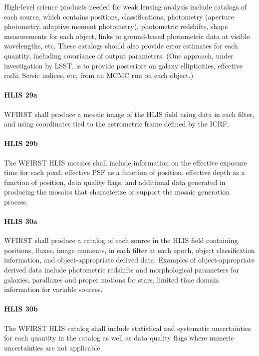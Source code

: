 High-level science products needed for weak lensing analysis include catalogs of
each source, which contains positions, classifications, photometry (aperture
photometry, adaptive moment photometry), photometric redshifts, shape
measurements for each object, links to ground-based photometric data at visible
wavelengths, etc. These catalogs should also provide error estimates for each
quantity, including covariance of output parameters. (One approach, under
investigation by LSST, is to provide posteriors on galaxy ellipticities,
effective radii, Sersic indices, etc, from an MCMC run on each object.)

\paragraph{HLIS 29a} WFIRST shall produce a mosaic image of the HLIS field using data in
each filter, and using coordinates tied to the astrometric frame defined by the
ICRF.

\paragraph{HLIS 29b} The WFIRST HLIS mosaics shall include information on the effective
exposure time for each pixel, effective PSF as a function of position, effective
depth as a function of position, data quality flags, and additional data
generated in producing the mosaics that characterize or support the mosaic
generation process.

\paragraph{HLIS 30a} WFIRST shall produce a catalog of each source in the HLIS field
containing positions, fluxes, image moments, in each filter at each epoch,
object classification information, and object-appropriate derived data. Examples
of object-appropriate derived data include photometric redshifts and
morphological parameters for galaxies, parallaxes and proper motions for stars,
limited time domain information for variable sources.

\paragraph{HLIS 30b} The WFIRST HLIS catalog shall include statistical and systematic
uncertainties for each quantity in the catalog as well as data quality flags
where numeric uncertainties are not applicable.

